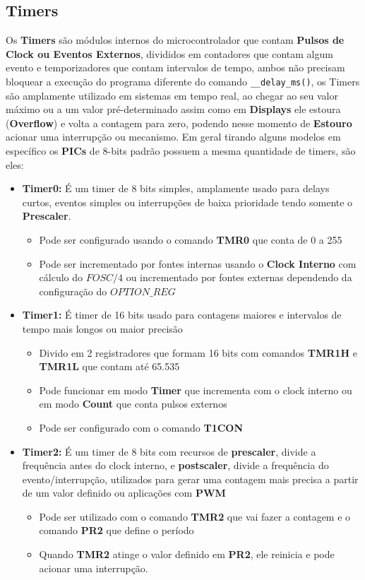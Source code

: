 \documentclass[12pt,a4paper]{book}
\begin{document}
\subsection{Timers}
Os \textbf{Timers} são módulos internos do microcontrolador que contam \textbf{Pulsos de Clock ou Eventos Externos}, divididos em contadores que contam algum evento e temporizadores que contam intervalos de tempo, ambos não precisam bloquear a execução do programa diferente do comando \texttt{\_\_delay\_ms()}, os Timers são amplamente utilizado em sistemas em tempo real, ao chegar ao seu valor máximo ou a um valor pré-determinado assim como em \textbf{Displays} ele estoura (\textbf{Overflow}) e volta a contagem para zero, podendo nesse momento de \textbf{Estouro} acionar uma interrupção ou mecanismo. Em geral tirando alguns modelos em específico os \textbf{PICs} de 8-bits padrão possuem a mesma quantidade de timers, são eles:
\begin{itemize}
    \item \textbf{Timer0:} É um timer de 8 bits simples, amplamente usado para delays curtos, eventos simples ou interrupções de baixa prioridade tendo somente o \textbf{Prescaler}.
    \begin{itemize}
        \item Pode ser configurado usando o comando \textbf{TMR0} que conta de 0 a 255
        \item Pode ser incrementado por fontes internas usando o \textbf{Clock Interno} com cálculo do $FOSC / 4$ ou incrementado por fontes externas dependendo da configuração do $OPTION\_REG$
    \end{itemize}
    \item \textbf{Timer1:} É timer de 16 bits usado para contagens maiores e intervalos de tempo mais longos ou maior precisão
    \begin{itemize}
        \item Divido em 2 registradores que formam 16 bits com comandos  \textbf{TMR1H} e \textbf{TMR1L} que contam até 65.535
        \item Pode funcionar em modo \textbf{Timer} que incrementa com o clock interno ou em modo \textbf{Count} que conta pulsos externos
        \item Pode ser configurado com o comando \textbf{T1CON}
    \end{itemize}
    \item \textbf{Timer2:} É um timer de 8 bits com recursos de \textbf{prescaler}, divide a frequência antes do clock interno, e \textbf{postscaler}, divide a frequência do evento/interrupção, utilizados para gerar uma contagem mais precisa a partir de um valor definido ou aplicações com \textbf{PWM}
    \begin{itemize}
        \item Pode ser utilizado com o comando \textbf{TMR2} que vai fazer a contagem e o comando \textbf{PR2} que define o período
        \item Quando \textbf{TMR2} atinge o valor definido em \textbf{PR2}, ele reinicia e pode acionar uma interrupção.
    \end{itemize}
\end{itemize}
\end{document}
